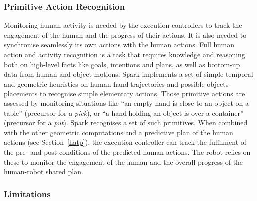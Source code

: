 \documentclass[preprint,3p,times]{elsarticle}
\begin{document}
%

\subsubsection{Primitive Action Recognition}

Monitoring human activity is needed by the execution controllers to track the
engagement of the human and the progress of their actions. It is also needed to synchronise seamlessly
its own actions with the human actions. Full human action
and activity recognition is a task that requires knowledge and reasoning both on
high-level facts like goals, intentions and plans, as well as bottom-up data
from human and object motions. {\sc Spark} implements a set of simple temporal and
geometric heuristics on human hand trajectories and possible objects placements
to recognise simple elementary actions. Those primitive actions are assessed by
monitoring situations like ``an empty hand is close to an object on a table''
(precursor for a \emph{pick}), or ``a hand holding an object is over a
container'' (precursor for a \emph{put}).  {\sc Spark} recognises a set of
such primitives. When combined with the other geometric computations and a predictive
plan of the human actions (see Section~\ref{hatp}), the execution controller can
track the fulfilment of the pre- and post-conditions of the predicted human
actions. The robot relies on these to monitor the engagement of the human and the
overall progress of the human-robot shared plan.

\subsubsection{Limitations}
\end{document}
